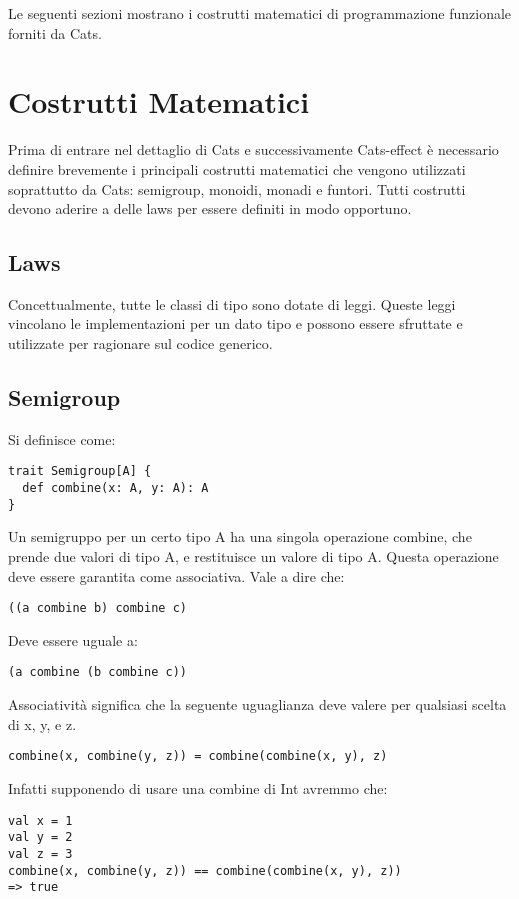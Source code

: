 \noindent Le seguenti sezioni mostrano i costrutti matematici di programmazione funzionale forniti da Cats.

\section{Costrutti Matematici}

Prima di entrare nel dettaglio di Cats e successivamente Cats-effect è necessario definire brevemente i principali costrutti matematici che vengono utilizzati soprattutto da Cats: semigroup, monoidi, monadi e funtori. Tutti costrutti devono aderire a delle laws per essere definiti in modo opportuno.

\subsection{Laws}
Concettualmente, tutte le classi di tipo sono dotate di leggi. Queste leggi vincolano le implementazioni per un dato tipo e possono essere sfruttate e utilizzate per ragionare sul codice generico.

\subsection{Semigroup}
Si definisce come:
\begin{verbatim}
trait Semigroup[A] {
  def combine(x: A, y: A): A
}
\end{verbatim}

\noindent Un semigruppo per un certo tipo A ha una singola operazione combine, che prende due valori di tipo A, e restituisce un valore di tipo A. Questa operazione deve essere garantita come associativa. Vale a dire che:
\begin{verbatim}
((a combine b) combine c)
\end{verbatim}
Deve essere uguale a:
\begin{verbatim}
(a combine (b combine c))
\end{verbatim}

\noindent Associatività significa che la seguente uguaglianza deve valere per qualsiasi scelta di x, y, e z.
\begin{verbatim}
combine(x, combine(y, z)) = combine(combine(x, y), z)
\end{verbatim}

\noindent Infatti supponendo di usare una combine di Int avremmo che:
\begin{verbatim}
val x = 1
val y = 2
val z = 3
combine(x, combine(y, z)) == combine(combine(x, y), z))
=> true
\end{verbatim}
